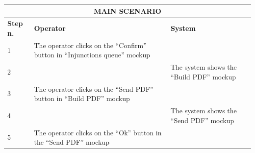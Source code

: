 {{{\begin{center}
			\begin{tabular}{|p{2cm}|p{6cm}|p{6cm}|}
			\hline
				\multicolumn{3}{|c|}{MAIN SCENARIO}\\
			\hline
				\centering \vspace{1mm} \bfseries{Step n.} \vspace{1mm} & \vspace{1mm} \bfseries{Operator} \vspace{1mm} & \vspace{1mm} \bfseries{System} \vspace{1mm}\\
			\hline
				\vspace{1mm} 1\vspace{1mm} &
				\vspace{1mm} The operator clicks on the “Confirm” button in “Injunctions queue” mockup\vspace{1mm} & 
				\vspace{1mm} \vspace{1mm} \\
			\hline
				\vspace{1mm} 2\vspace{1mm} &
				\vspace{1mm} \vspace{1mm} & 
				\vspace{1mm} The system shows the “Build PDF” mockup\vspace{1mm} \\
			\hline
				\vspace{1mm} 3\vspace{1mm} &
				\vspace{1mm} The operator clicks on the “Send PDF” button in “Build PDF” mockup\vspace{1mm} & 
				\vspace{1mm} \vspace{1mm} \\
			\hline
				\vspace{1mm} 4\vspace{1mm} &
				\vspace{1mm} \vspace{1mm} & 
				\vspace{1mm} The system shows the “Send PDF” mockup\vspace{1mm} \\
			\hline
				\vspace{1mm} 5\vspace{1mm} &
				\vspace{1mm} The operator clicks on the “Ok” button in the “Send PDF” mockup\vspace{1mm} & 

\end{tabular}
\end{center}}}}
